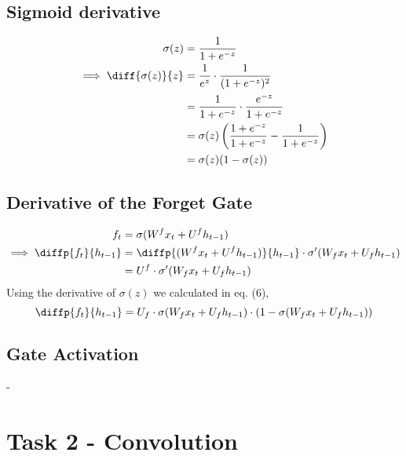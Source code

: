 \documentclass[9pt]{paper}
\begin{document}
\subsection{Sigmoid derivative}
\begin{equation}
\begin{split}
	\sigma(z) &= \frac{1}{1+e^{-z}}\\
	\implies\diff{\sigma(z)}{z} &= \frac{1}{e^z}\cdot\frac{1}{(1+e^{-z})^2}\\
	           &= \frac{1}{1+e^{-z}}\cdot\frac{e^{-z}}{1+e^{-z}}\\
	           &= \sigma(z)\left(\frac{1+e^{-z}}{1+e^{-z}} - \frac{1}{1+e^{-z}}\right)\\
	           &= \sigma(z)(1 - \sigma(z))\\
\end{split}
\end{equation}

\subsection{Derivative of the Forget Gate}
\begin{equation*}
\begin{split}
	f_t &= \sigma(W^f x_t + U^f h_{t-1})\\
	\implies \diffp{f_t}{{h_{t-1}}} &= \diffp{(W^f x_t + U^f h_{t-1})}{{h_{t-1}}} \cdot \sigma'(W_{f}{x_{t}} + U_{f}{h_{t-1}})\\
	&= U^f \cdot \sigma'(W_{f}{x_{t}} + U_{f}{h_{t-1}})\\
\end{split}
\end{equation*}
Using the derivative of $\sigma(z)$ we calculated in eq. (6),
\begin{equation}
	\diffp{f_t}{{h_{t-1}}} = U_f\\
	\cdot\sigma(W_f x_{t} + U_f{h_{t-1}})\\
	\cdot(1 - \sigma(W_{f}{x_{t}} + U_{f}{h_{t-1}}))\\
\end{equation}

\subsection{Gate Activation}
-

\section{Task 2 - Convolution}
\end{document}
